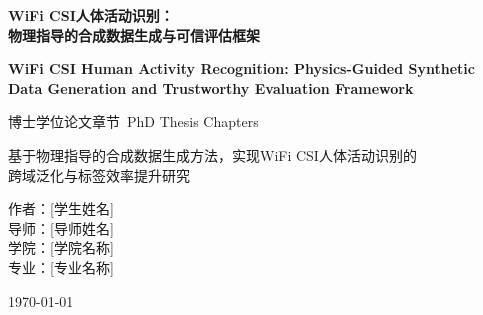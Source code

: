 \documentclass[12pt,a4paper,oneside]{book}
\begin{document}
\pagestyle{fancy}
\fancyhf{}
\fancyhead[L]{\leftmark}
\fancyhead[R]{\thepage}
\renewcommand{\headrulewidth}{0.4pt}

\onehalfspacing

\begin{titlepage}
\centering
\vspace*{2cm}

{\Huge\bfseries WiFi CSI人体活动识别：\\物理指导的合成数据生成与可信评估框架}

\vspace{1cm}

{\Large\bfseries WiFi CSI Human Activity Recognition: Physics-Guided Synthetic Data Generation and Trustworthy Evaluation Framework}

\vspace{2cm}

{\large 
博士学位论文章节\
PhD Thesis Chapters
}

\vspace{2cm}

{\large
基于物理指导的合成数据生成方法，实现WiFi CSI人体活动识别的\\
跨域泛化与标签效率提升研究
}

\vspace{2cm}

{\large 
作者：[学生姓名]\\
导师：[导师姓名]\\
学院：[学院名称]\\
专业：[专业名称]
}

\vspace{2cm}

{\large \today}

\end{titlepage}

\tableofcontents
\newpage

\listoffigures
\listoftables
\newpage

\printglossary[type=\acronymtype,title=缩略词表]
\newpage





\appendix






\end{document}
